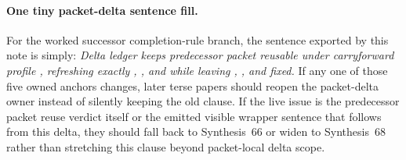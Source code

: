 \documentclass[11pt]{article}
\begin{document}
\paragraph{One tiny packet-delta sentence fill.}
For the worked successor completion-rule branch, the sentence exported by this note is simply: \emph{Delta ledger  keeps predecessor packet  reusable under carryforward profile , refreshing exactly , , and  while leaving , , and  fixed.} If any one of those five owned anchors changes, later terse papers should reopen the packet-delta owner instead of silently keeping the old clause. If the live issue is the predecessor packet reuse verdict itself or the emitted visible wrapper sentence that follows from this delta, they should fall back to Synthesis~66 or widen to Synthesis~68 rather than stretching this clause beyond packet-local delta scope.\cite{series:workedexample}
\end{document}

